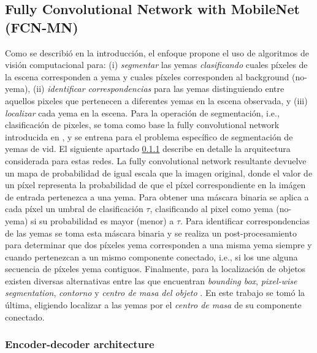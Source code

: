 \documentclass[a4paper,authoryear,review]{elsarticle}
\begin{document}

\subsection{Fully Convolutional Network with MobileNet (FCN-MN)} 
\label{sec:fcn}


Como se describió en la introducción, el enfoque propone el uso de algoritmos de visión computacional para: (i) \emph{segmentar} las yemas \emph{clasificando} cuales píxeles de la escena corresponden a yema y cuales píxeles corresponden al background (no-yema), (ii) \emph{identificar correspondencias} para las yemas distinguiendo entre aquellos pixeles que pertenecen a diferentes yemas en la escena observada, y (iii) \emph{localizar} cada yema en la escena. 
%
Para la operación de segmentación, i.e., clasificación de pixeles, se toma como base la fully convolutional network introducida en \citep{long2015fully}, y se entrena para el problema específico de segmentación de yemas de vid. El siguiente apartado \ref{sec:fcnmn} describe en detalle la arquitectura considerada para estas redes.
%
La fully convolutional network resultante devuelve un mapa de probabilidad de igual escala que la imagen original, donde el valor de un píxel representa la probabilidad de que el píxel correspondiente en la imágen de entrada pertenezca a una yema. 
%
Para obtener una máscara binaria se aplica a cada píxel un umbral de clasificación $\tau$, clasificando al pixel como yema (no-yema) si su probabilidad es mayor (menor) a $\tau$. 
%
Para identificar correspondencias de las yemas se toma esta máscara binaria y se realiza un post-procesamiento para determinar que dos píxeles yema corresponden a una misma yema siempre y cuando pertenezcan a un mismo componente conectado, i.e., si los une alguna secuencia de píxeles yema contiguos. 
%
Finalmente, para la localización de objetos existen diversas alternativas entre las que encuentran \emph{bounding box}, \emph{pixel-wise segmentation}, \emph{contorno} y \emph{centro de masa del objeto} \citep{lampert2008beyond}. En este trabajo se tomó la última, eligiendo localizar a las yemas por el \emph{centro de masa} de su componente conectado. 


\subsubsection {Encoder-decoder architecture}  \label{sec:fcnmn}
\end{document}
